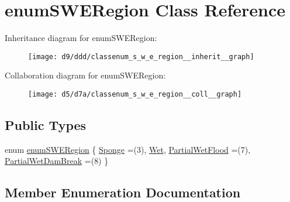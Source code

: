 \hypertarget{classenum_s_w_e_region}{}\section{enum\+S\+W\+E\+Region Class Reference}
\label{classenum_s_w_e_region}


Inheritance diagram for enum\+S\+W\+E\+Region\+:
\nopagebreak
\begin{figure}[H]
\begin{center}
\leavevmode
\texttt{[image: d9/ddd/classenum\_s\_w\_e\_region\_\_inherit\_\_graph]}
\end{center}
\end{figure}


Collaboration diagram for enum\+S\+W\+E\+Region\+:
\nopagebreak
\begin{figure}[H]
\begin{center}
\leavevmode
\texttt{[image: d5/d7a/classenum\_s\_w\_e\_region\_\_coll\_\_graph]}
\end{center}
\end{figure}
\subsection*{Public Types}
\begin{DoxyCompactItemize}
\item 
enum \hyperlink{classenum_s_w_e_region_ae681d55d0b68af9b7efbe660da59e9bb}{enum\+S\+W\+E\+Region} \{ \hyperlink{classenum_s_w_e_region_ae681d55d0b68af9b7efbe660da59e9bba25df9840671a24d4521bc9b9df481fba}{Sponge} =(3), 
\hyperlink{classenum_s_w_e_region_ae681d55d0b68af9b7efbe660da59e9bbaa0a9e3006198fee757e85027064bdfcd}{Wet}, 
\hyperlink{classenum_s_w_e_region_ae681d55d0b68af9b7efbe660da59e9bba05fb05087b7ba70edf4f55c1d7f6e812}{Partial\+Wet\+Flood} =(7), 
\hyperlink{classenum_s_w_e_region_ae681d55d0b68af9b7efbe660da59e9bbaeeadf2201bfdeb2700dca896b0eb11d7}{Partial\+Wet\+Dam\+Break} =(8)
 \}
\end{DoxyCompactItemize}


\subsection{Member Enumeration Documentation}
\mbox{\label{classenum_s_w_e_region_ae681d55d0b68af9b7efbe660da59e9bb}} 
